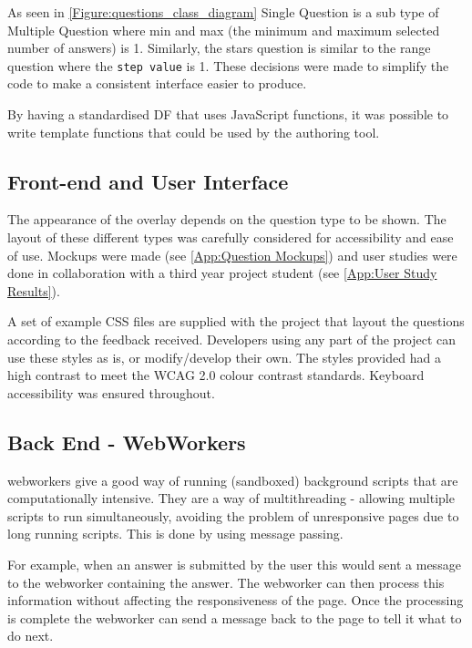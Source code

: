As seen in \autoref{Figure:questions_class_diagram} Single Question is a sub type of Multiple Question where min and max (the minimum and maximum selected number of answers) is 1. Similarly, the stars question is similar to the range question where the \lstinline|step value| is 1. These decisions were made to simplify the code to make a consistent interface easier to produce.

By having a standardised \gls{DF} that uses JavaScript functions, it was possible to write template functions that could be used by the authoring tool.

\subsection{Front-end and User Interface}

The appearance of the overlay depends on the question type to be shown. The layout of these different types was carefully considered for accessibility and ease of use. Mockups were made (see \cref{App:Question Mockups}) and user studies were done in collaboration with a third year project student (see \cref{App:User Study Results}).

A set of example \gls{CSS} files are supplied with the project that layout the questions according to the feedback received. Developers using any part of the project can use these styles as is, or modify/develop their own. The styles provided had a high contrast to meet the \gls{WCAG} 2.0 colour contrast standards. Keyboard accessibility was ensured throughout.

\subsection{Back End - WebWorkers}
\label{Subsection:WebWorkers}

\Glspl{webworker} give a good way of running (sandboxed) background scripts that are computationally intensive. They are a way of multithreading - allowing multiple scripts to run simultaneously, avoiding the problem of unresponsive pages due to long running scripts. This is done by using message passing.

For example, when an answer is submitted by the user this would sent a message to the \gls{webworker} containing the answer. The \gls{webworker} can then process this information without affecting the responsiveness of the page. Once the processing is complete the \gls{webworker} can send a message back to the page to tell it what to do next.

